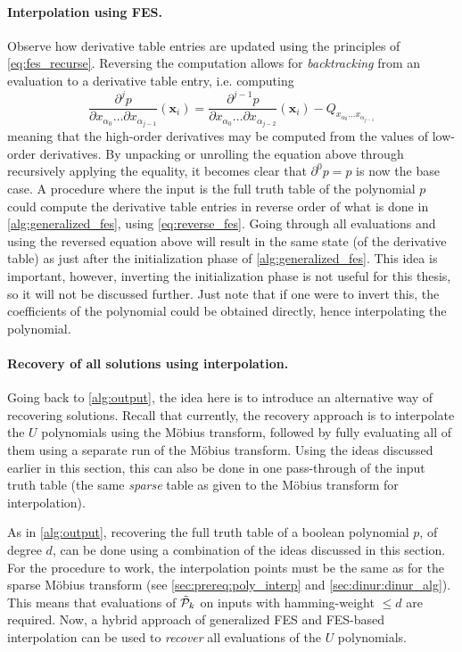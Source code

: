 \paragraph{Interpolation using FES.} Observe how derivative table entries are updated using the principles of \cref{eq:fes_recurse}. Reversing the computation allows for \textit{backtracking} from an evaluation to a derivative table entry, i.e. computing 
\begin{equation} \label{eq:reverse_fes}    
\frac{\partial^j p}{\partial x_{\alpha_0} \dots \partial x_{\alpha_{j - 1}}}(\mathbf{x}_i) = \frac{\partial^{j - 1} p}{\partial x_{\alpha_0} \dots \partial x_{\alpha_{j - 2}}}(\mathbf{x}_i) - Q_{x_{\alpha_0} \dots x_{\alpha_{j - 1}}}
\end{equation}
meaning that the high-order derivatives may be computed from the values of low-order derivatives. By unpacking or unrolling the equation above through recursively applying the equality, it becomes clear that $\partial^0 p = p$ is now the base case. A procedure where the input is the full truth table of the polynomial $p$ could compute the derivative table entries in reverse order of what is done in \cref{alg:generalized_fes}, using \cref{eq:reverse_fes}. Going through all evaluations and using the reversed equation above will result in the same state (of the derivative table) as just after the initialization phase of \cref{alg:generalized_fes}. This idea is important, however, inverting the initialization phase is not useful for this thesis, so it will not be discussed further. Just note that if one were to invert this, the coefficients of the polynomial could be obtained directly, hence interpolating the polynomial.

\paragraph{Recovery of all solutions using interpolation.} Going back to \cref{alg:output}, the idea here is to introduce an alternative way of recovering solutions. Recall that currently, the recovery approach is to interpolate the $U$ polynomials using the Möbius transform, followed by fully evaluating all of them using a separate run of the Möbius transform. Using the ideas discussed earlier in this section, this can also be done in one pass-through of the input truth table (the same \textit{sparse} table as given to the Möbius transform for interpolation).

As in \cref{alg:output}, recovering the full truth table of a boolean polynomial $p$, of degree $d$, can be done using a combination of the ideas discussed in this section. For the procedure to work, the interpolation points must be the same as for the sparse Möbius transform (see \cref{sec:prereq:poly_interp} and \cref{sec:dinur:dinur_alg}). This means that evaluations of $\Tilde{\mathcal{P}}_k$ on inputs with hamming-weight $\leq d$ are required. Now, a hybrid approach of generalized FES and FES-based interpolation can be used to \textit{recover} all evaluations of the $U$ polynomials. 


